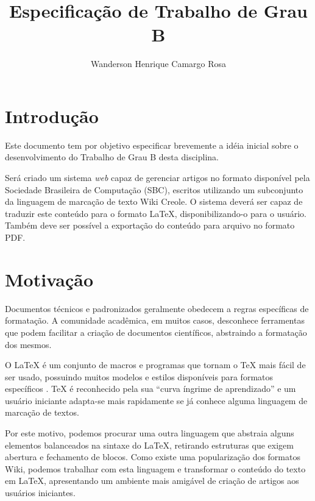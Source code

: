 \documentclass{article}
\title{Especificação de Trabalho de Grau B}
\author{Wanderson Henrique Camargo Rosa\inst{1}}
\begin{document}
\maketitle{}

\section{Introdução}
\label{sec:introducao}

Este documento tem por objetivo especificar brevemente a idéia inicial sobre o
desenvolvimento do Trabalho de Grau B desta disciplina.

Será criado um sistema \textit{web} capaz de gerenciar artigos no formato
disponível pela Sociedade Brasileira de Computação (SBC), escritos utilizando um
subconjunto da linguagem de marcação de texto Wiki Creole. O sistema deverá ser
capaz de traduzir este conteúdo para o formato \LaTeX{}, disponibilizando-o para
o usuário. Também deve ser possível a exportação do conteúdo para arquivo no
formato PDF.

\section{Motivação}
\label{sec:motivLorem ipsumacao}

Documentos técnicos e padronizados geralmente obedecem a regras específicas de
formatação. A comunidade acadêmica, em muitos casos, desconhece ferramentas que
podem facilitar a criação de documentos científicos, abstraindo a formatação dos
mesmos.

O \LaTeX{} é um conjunto de macros e programas que tornam o \TeX{} mais fácil de
ser usado, possuindo muitos modelos e estilos disponíveis para formatos
específicos \cite{p241-salzberg}. \TeX{} é reconhecido pela sua ``curva íngrime
de aprendizado'' e um usuário iniciante adapta-se mais rapidamente se já conhece
alguma linguagem de marcação de textos.

Por este motivo, podemos procurar uma outra linguagem que abstraia alguns
elementos balanceados na sintaxe do \LaTeX{}, retirando estruturas que exigem
abertura e fechamento de blocos. Como existe uma popularização dos formatos
Wiki, podemos trabalhar com esta linguagem e transformar o conteúdo do texto em
\LaTeX{}, apresentando um ambiente mais amigável de criação de artigos aos
usuários iniciantes.
\end{document}
